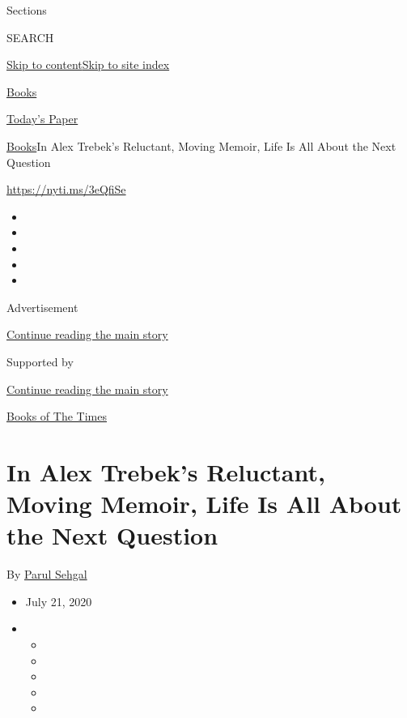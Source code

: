 Sections

SEARCH

\protect\hyperlink{site-content}{Skip to
content}\protect\hyperlink{site-index}{Skip to site index}

\href{https://www.nytimes.com/section/books}{Books}

\href{https://myaccount.nytimes.com/auth/login?response_type=cookie\&client_id=vi}{}

\href{https://www.nytimes.com/section/todayspaper}{Today's Paper}

\href{/section/books}{Books}\textbar{}In Alex Trebek's Reluctant, Moving
Memoir, Life Is All About the Next Question

\url{https://nyti.ms/3eQfiSe}

\begin{itemize}
\item
\item
\item
\item
\item
\end{itemize}

Advertisement

\protect\hyperlink{after-top}{Continue reading the main story}

Supported by

\protect\hyperlink{after-sponsor}{Continue reading the main story}

\href{/column/books-of-the-times}{Books of The Times}

\hypertarget{in-alex-trebeks-reluctant-moving-memoir-life-is-all-about-the-next-question}{%
\section{In Alex Trebek's Reluctant, Moving Memoir, Life Is All About
the Next
Question}\label{in-alex-trebeks-reluctant-moving-memoir-life-is-all-about-the-next-question}}

By \href{https://www.nytimes.com/by/parul-sehgal}{Parul Sehgal}

\begin{itemize}
\item
  July 21, 2020
\item
  \begin{itemize}
  \item
  \item
  \item
  \item
  \item
  \end{itemize}
\end{itemize}

